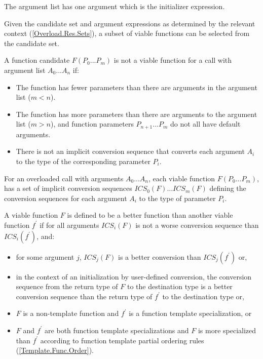 \p The argument list has one argument which is the initializer expression.


\p Given the candidate set and argument expressions as determined by the
relevant context (\ref{Overload.Res.Sets}), a subset of viable functions can be
selected from the candidate set.

\p A function candidate $F(P_0 ... P_m)$ is not a viable function for a call
with argument list $A_0 ... A_n$ if:

\begin{itemize}
\item The function has fewer parameters than there are
  arguments in the argument list ($m < n$).
\item The function has more parameters than there are arguments to the
  argument list ($m > n$), and function parameters $ P_{n+1} ... P_m $ do not
  all have default arguments.
\item There is not an implicit conversion sequence that converts each argument
  $A_i$ to the type of the corresponding parameter $P_i$.
\end{itemize}


\p For an overloaded call with arguments $A_0 ... A_n$, each viable function
$F(P_0 ... P_m)$, has a set of implicit conversion sequences $ICS_0(F) ... ICS_m(F)$
defining the conversion sequences for each argument $A_i$ to the
type of parameter $P_i$.

\p A viable function $F$ is defined to be a better function than another
viable function $f^\prime$ if for all arguments $ICS_i(F)$ is not a worse
conversion sequence than $ICS_i(f^\prime)$, and:

\begin{itemize}
\item for some argument $j$, $ICS_j(F)$ is a better conversion than
  $ICS_j(f^\prime)$ or,
\item in the context of an initialization by user-defined conversion, the
  conversion sequence from the return type of $F$ to the destination type is a
  better conversion sequence than the return type of $f^\prime$ to the destination
  type or,
\item $F$ is a non-template function and $f^\prime$ is a function template
  specialization, or
\item $F$ and $f^\prime$ are both function template specializations and $F$ is
  more specialized than $f^\prime$ according to function template partial ordering
  rules (\ref{Template.Func.Order}).
\end{itemize}

